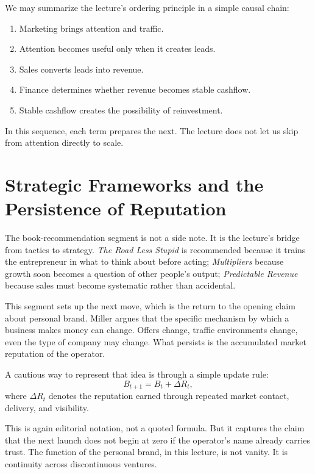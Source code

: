 We may summarize the lecture's ordering principle in a simple causal chain:
\begin{enumerate}
\item Marketing brings attention and traffic.
\item Attention becomes useful only when it creates leads.
\item Sales converts leads into revenue.
\item Finance determines whether revenue becomes stable cashflow.
\item Stable cashflow creates the possibility of reinvestment.
\end{enumerate}

In this sequence, each term prepares the next. The lecture does not let us skip from attention directly to scale.

\section{Strategic Frameworks and the Persistence of Reputation}

The book-recommendation segment is not a side note. It is the lecture's bridge from tactics to strategy. \emph{The Road Less Stupid} is recommended because it trains the entrepreneur in what to think about before acting; \emph{Multipliers} because growth soon becomes a question of other people's output; \emph{Predictable Revenue} because sales must become systematic rather than accidental.

This segment sets up the next move, which is the return to the opening claim about personal brand. Miller argues that the specific mechanism by which a business makes money can change. Offers change, traffic environments change, even the type of company may change. What persists is the accumulated market reputation of the operator.

A cautious way to represent that idea is through a simple update rule:
\begin{equation}
B_{t+1}=B_t+\Delta R_t,
\end{equation}
where \(\Delta R_t\) denotes the reputation earned through repeated market contact, delivery, and visibility.

This is again editorial notation, not a quoted formula. But it captures the claim that the next launch does not begin at zero if the operator's name already carries trust. The function of the personal brand, in this lecture, is not vanity. It is continuity across discontinuous ventures.

